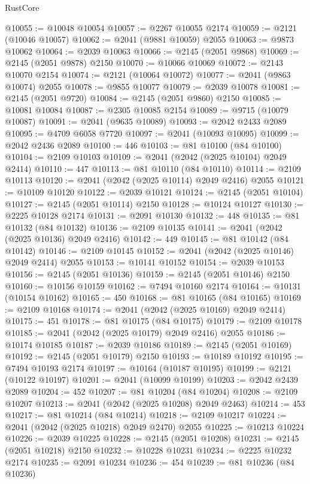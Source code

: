 \begin{lexlean}{RustCore}
\begin{coremodule}
@10055 := @10048 @10054
@10057 := @2267 @10055 @2174
@10059 := @2121 (@10046 @10057)
@10062 := @2041 (@9881 @10059) @2055
@10063 := @9873 @10062
@10064 := @2039 @10063
@10066 := @2145 (@2051 @9868)
@10069 := @2145 (@2051 @9878) @2150
@10070 := @10066 @10069
@10072 := @2143 @10070 @2154
@10074 := @2121 (@10064 @10072)
@10077 := @2041 (@9863 @10074) @2055
@10078 := @9855 @10077
@10079 := @2039 @10078
@10081 := @2145 (@2051 @9720)
@10084 := @2145 (@2051 @9860) @2150
@10085 := @10081 @10084
@10087 := @2305 @10085 @2154
@10089 := @9715 (@10079 @10087)
@10091 := @2041 (@9635 @10089)
@10093 := @2042 @2433 @2089
@10095 := @4709 @6058 @7720
@10097 := @2041 (@10093 @10095)
@10099 := @2042 @2436 @2089
@10100 := 446
@10103 := @81 @10100 (@84 @10100)
@10104 := @2109 @10103
@10109 := @2041 (@2042 (@2025 @10104) @2049 @2414)
@10110 := 447
@10113 := @81 @10110 (@84 @10110)
@10114 := @2109 @10113
@10120 := @2041 (@2042 (@2025 @10114) @2049 @2416) @2055
@10121 := @10109 @10120
@10122 := @2039 @10121
@10124 := @2145 (@2051 @10104)
@10127 := @2145 (@2051 @10114) @2150
@10128 := @10124 @10127
@10130 := @2225 @10128 @2174
@10131 := @2091 @10130
@10132 := 448
@10135 := @81 @10132 (@84 @10132)
@10136 := @2109 @10135
@10141 := @2041 (@2042 (@2025 @10136) @2049 @2416)
@10142 := 449
@10145 := @81 @10142 (@84 @10142)
@10146 := @2109 @10145
@10152 := @2041 (@2042 (@2025 @10146) @2049 @2414) @2055
@10153 := @10141 @10152
@10154 := @2039 @10153
@10156 := @2145 (@2051 @10136)
@10159 := @2145 (@2051 @10146) @2150
@10160 := @10156 @10159
@10162 := @7494 @10160 @2174
@10164 := @10131 (@10154 @10162)
@10165 := 450
@10168 := @81 @10165 (@84 @10165)
@10169 := @2109 @10168
@10174 := @2041 (@2042 (@2025 @10169) @2049 @2414)
@10175 := 451
@10178 := @81 @10175 (@84 @10175)
@10179 := @2109 @10178
@10185 := @2041 (@2042 (@2025 @10179) @2049 @2416) @2055
@10186 := @10174 @10185
@10187 := @2039 @10186
@10189 := @2145 (@2051 @10169)
@10192 := @2145 (@2051 @10179) @2150
@10193 := @10189 @10192
@10195 := @7494 @10193 @2174
@10197 := @10164 (@10187 @10195)
@10199 := @2121 (@10122 @10197)
@10201 := @2041 (@10099 @10199)
@10203 := @2042 @2439 @2089
@10204 := 452
@10207 := @81 @10204 (@84 @10204)
@10208 := @2109 @10207
@10213 := @2041 (@2042 (@2025 @10208) @2049 @2463)
@10214 := 453
@10217 := @81 @10214 (@84 @10214)
@10218 := @2109 @10217
@10224 := @2041 (@2042 (@2025 @10218) @2049 @2470) @2055
@10225 := @10213 @10224
@10226 := @2039 @10225
@10228 := @2145 (@2051 @10208)
@10231 := @2145 (@2051 @10218) @2150
@10232 := @10228 @10231
@10234 := @2225 @10232 @2174
@10235 := @2091 @10234
@10236 := 454
@10239 := @81 @10236 (@84 @10236)

\end{coremodule}
\end{lexlean}
